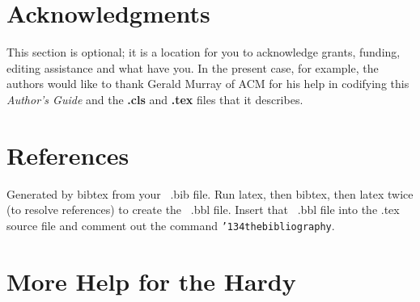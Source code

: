 \documentclass{sig-alternate-05-2015}
\begin{document}
\section{Acknowledgments}
This section is optional; it is a location for you
to acknowledge grants, funding, editing assistance and
what have you.  In the present case, for example, the
authors would like to thank Gerald Murray of ACM for
his help in codifying this \textit{Author's Guide}
and the \textbf{.cls} and \textbf{.tex} files that it describes.


\section{References}
Generated by bibtex from your ~.bib file.  Run latex,
then bibtex, then latex twice (to resolve references)
to create the ~.bbl file.  Insert that ~.bbl file into
the .tex source file and comment out
the command \texttt{{\char'134}thebibliography}.
\section{More Help for the Hardy}
\end{document}
